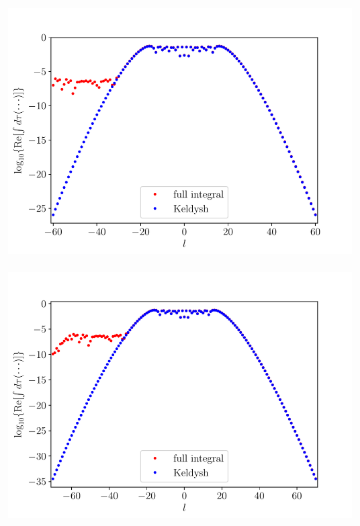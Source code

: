 \begin{figure}
\begin{subfigure}[b]{0.33\linewidth}
\end{subfigure}
\begin{subfigure}[b]{0.33\linewidth}
  \includegraphics[width=\textwidth]{figures/ch_ATI_SFA/He/l60n512WP40PG25MR35vsKeldysh.pdf}
\end{subfigure}
\begin{subfigure}[b]{0.33\linewidth}
  \includegraphics[width=\textwidth]{figures/ch_ATI_SFA/He/l70n512WP40PG25MR35vsKeldysh.pdf}
\end{subfigure}
\begin{subfigure}[b]{0.33\linewidth}

\end{subfigure}
\end{figure}
